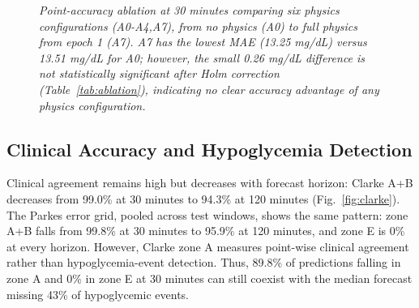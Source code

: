 \documentclass[journal]{IEEEtran}
\begin{document}
\begin{figure}[t]
\centering
{}
\caption{\small\textit{Point-accuracy ablation at 30 minutes comparing six physics configurations (A0-A4,A7), from no physics (A0) to full physics from epoch 1 (A7). A7 has the lowest MAE (13.25 mg/dL) versus 13.51 mg/dL for A0; however, the small 0.26 mg/dL difference is not statistically significant after Holm correction (Table~\ref{tab:ablation}), indicating no clear accuracy advantage of any physics configuration.}}
\label{fig:ablationfig}
\end{figure}

\subsection{Clinical Accuracy and Hypoglycemia Detection}

Clinical agreement remains high but decreases with forecast horizon: Clarke A+B decreases from 99.0\% at 30 minutes to 94.3\% at 120 minutes (Fig.~\ref{fig:clarke}). The Parkes error grid, pooled across test windows, shows the same pattern: zone A+B falls from 99.8\% at 30 minutes to 95.9\% at 120 minutes, and zone E is 0\% at every horizon. However, Clarke zone A measures point-wise clinical agreement rather than hypoglycemia-event detection. Thus, 89.8\% of predictions falling in zone A and 0\% in zone E at 30 minutes can still coexist with the median forecast missing 43\% of hypoglycemic events.
\end{document}
